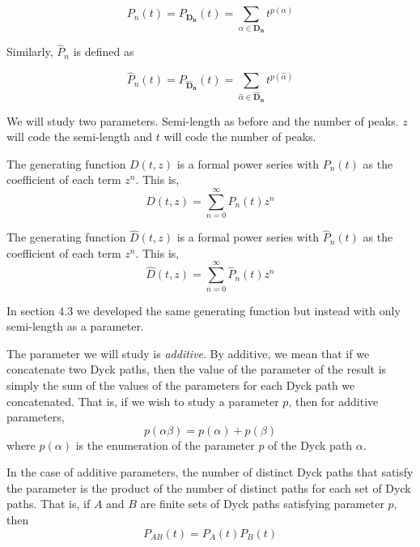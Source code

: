 \documentclass[12pt]{article}
\theoremstyle{definition}
\numberwithin{equation}{section}
\begin{document}
\begin{equation}
    P_n(t) = P_{\mathbf{D_n}}(t) = \sum_{\alpha\in\mathbf{D_n}}t^{p(\alpha)}
\end{equation}

Similarly, $\hat{P}_n$ is defined as

\begin{equation}
    \hat{P}_n(t) = P_{\mathbf{\hat{D}_n}}(t) = \sum_{\hat{\alpha}\in\mathbf{\hat{D}_n}}t^{p(\hat{\alpha})}
\end{equation}

We will study two parameters. Semi-length as before and the number of peaks. $z$ will code the semi-length and $t$ will code the number of peaks.

The generating function $D(t,z)$ is a formal power series with $P_n(t)$ as the coefficient of each term $z^n$. This is,
\begin{equation}
    D(t,z) = \sum_{n=0}^\infty P_n(t)z^n
\end{equation}

The generating function $\hat{D}(t,z)$ is a formal power series with $\hat{P}_n(t)$ as the coefficient of each term $z^n$. This is,
\begin{equation}
    \hat{D}(t,z) = \sum_{n=0}^\infty \hat{P}_n(t)z^n
\end{equation}

In section $4.3$ we developed the same generating function but instead with only semi-length as a parameter. %


The parameter we will study is \emph{additive}. By additive, we mean that if we concatenate two Dyck paths, then the value of the parameter of the result is simply the sum of the values of the parameters for each Dyck path we concatenated. That is, if we wish to study a parameter $p$, then for additive parameters, \[p(\alpha\beta) = p(\alpha) + p(\beta)\] where $p(\alpha)$ is the enumeration of the parameter $p$ of the Dyck path $\alpha$.

In the case of additive parameters, the number of distinct Dyck paths that satisfy the parameter is the product of the number of distinct paths for each set of Dyck paths. That is, if $A$ and $B$ are finite sets of Dyck paths satisfying parameter $p$, then
\[P_{AB}(t) = P_A(t)P_B(t)\]
\end{document}
